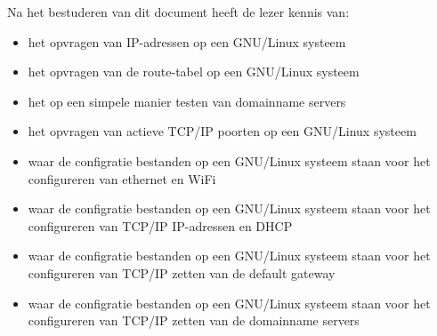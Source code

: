 Na het bestuderen van dit document heeft de lezer kennis van:
\begin{itemize}
\item het opvragen van IP-adressen op een GNU/Linux systeem
\item het opvragen van de route-tabel op een GNU/Linux systeem
\item het op een simpele manier testen van domainname servers
\item het opvragen van actieve TCP/IP poorten op een GNU/Linux systeem
\item waar de configratie bestanden op een GNU/Linux systeem staan voor het configureren van ethernet en WiFi
\item waar de configratie bestanden op een GNU/Linux systeem staan voor het configureren van TCP/IP IP-adressen en DHCP
\item waar de configratie bestanden op een GNU/Linux systeem staan voor het configureren van TCP/IP zetten van de default gateway
\item waar de configratie bestanden op een GNU/Linux systeem staan voor het configureren van TCP/IP zetten van de domainname servers
\end{itemize}


